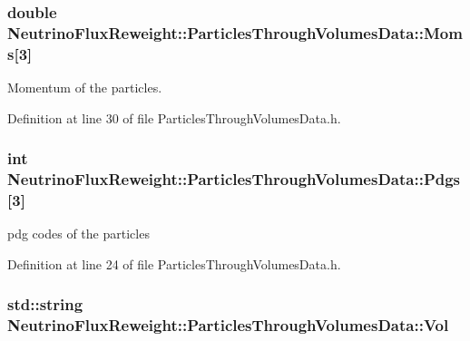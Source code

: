 \hypertarget{class_neutrino_flux_reweight_1_1_particles_through_volumes_data_a373e722f967c878fa1749ae224a721fc}{
\subsubsection[{Moms}]{\setlength{\rightskip}{0pt plus 5cm}double Neutrino\-Flux\-Reweight\-::\-Particles\-Through\-Volumes\-Data\-::\-Moms\mbox{[}3\mbox{]}}}\label{class_neutrino_flux_reweight_1_1_particles_through_volumes_data_a373e722f967c878fa1749ae224a721fc}


Momentum of the particles. 



Definition at line 30 of file Particles\-Through\-Volumes\-Data.\-h.

\hypertarget{class_neutrino_flux_reweight_1_1_particles_through_volumes_data_aa4f638f9eebba5ba2d59f909c077fa19}{
\subsubsection[{Pdgs}]{\setlength{\rightskip}{0pt plus 5cm}int Neutrino\-Flux\-Reweight\-::\-Particles\-Through\-Volumes\-Data\-::\-Pdgs\mbox{[}3\mbox{]}}}\label{class_neutrino_flux_reweight_1_1_particles_through_volumes_data_aa4f638f9eebba5ba2d59f909c077fa19}


pdg codes of the particles 



Definition at line 24 of file Particles\-Through\-Volumes\-Data.\-h.

\hypertarget{class_neutrino_flux_reweight_1_1_particles_through_volumes_data_a7981341eb993e13d4512cf438c1c2e52}{
\subsubsection[{Vol}]{\setlength{\rightskip}{0pt plus 5cm}std\-::string Neutrino\-Flux\-Reweight\-::\-Particles\-Through\-Volumes\-Data\-::\-Vol}}\label{class_neutrino_flux_reweight_1_1_particles_through_volumes_data_a7981341eb993e13d4512cf438c1c2e52}


